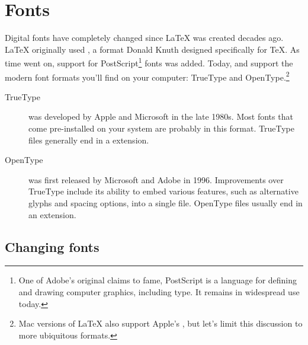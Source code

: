 \chapter{Fonts}
\label{fonts}

Digital fonts have completely changed since \LaTeX{} was created decades ago.
\LaTeX{} originally used \MF,
a format Donald Knuth designed specifically for \TeX{}.
As time went on, support for PostScript\footnote{One of
Adobe's original claims to fame,
PostScript is a language for defining and drawing computer graphics,
including type. It remains in widespread use today.} fonts was added.
Today, \LuaLaTeX{} and \XeLaTeX{} support the modern font formats you'll find
on your computer:
TrueType and OpenType.\punckern\footnote{Mac versions of \LaTeX{} also support
Apple's , but let's limit this discussion to
more ubiquitous formats.}

\begin{description}
\item[TrueType] was developed by Apple and Microsoft in the late 1980s.
    Most fonts that come pre-installed on your system are probably
    in this format.
    TrueType files generally end in a  extension.
\item[OpenType] was first released by Microsoft and Adobe in 1996.
    Improvements over TrueType include its ability to embed
    various features, such as alternative glyphs
    and spacing options, into a single file.
    OpenType files usually end in an  extension.
\end{description}

\section{Changing fonts}

